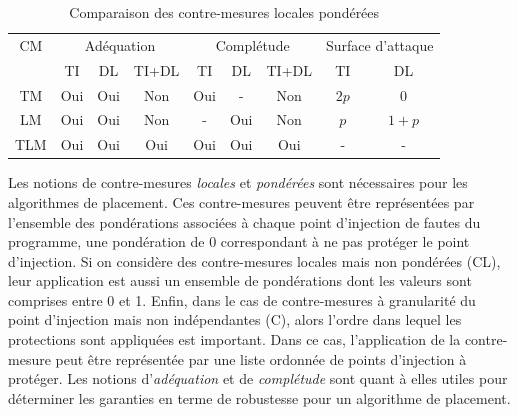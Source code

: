             \begin{table}[h]
                {\small
                \begin{center}
                    \begin{tabular}{c|ccc|ccc|cc}
                    CM & \multicolumn{3}{c|}{Adéquation} & \multicolumn{3}{c|}{Complétude} & \multicolumn{2}{c}{Surface d'attaque}  \\
                    \multicolumn{1}{l|}{} & TI & DL & TI+DL & TI & DL & TI+DL & TI & DL  \\
                    \hline
                    \gls{TM} & Oui & Oui & Non & Oui & - & Non & $2p$ & $0$  \\
                    \gls{LM} & Oui & Oui & Non & - & Oui & Non & $p$ & $1 + p$ \\
                    \gls{TLM} & Oui & Oui & Oui & Oui & Oui & Oui & - & - 
                    \end{tabular}
                \end{center} 
                }
                \caption{Comparaison des contre-mesures locales pondérées\label{tbl:local-cm-comparison}}
            \end{table}
        
            Les notions de contre-mesures \textit{locales} et \textit{pondérées} sont nécessaires pour les algorithmes de placement.
            Ces contre-mesures peuvent être représentées par l'ensemble des pondérations associées à chaque point d'injection de fautes du programme, une pondération de 0 correspondant à ne pas protéger le point d'injection. 
            Si on considère des contre-mesures locales mais non pondérées (\gls{CL}), leur application est aussi un ensemble de pondérations dont les valeurs sont comprises entre 0 et 1.
            Enfin, dans le cas de contre-mesures à granularité du point d'injection mais non indépendantes (C), alors l'ordre dans lequel les protections sont appliquées est important. Dans ce cas, l'application de la contre-mesure peut être représentée par une liste ordonnée de points d'injection à protéger.
            Les notions d'\textit{adéquation} et de \textit{complétude} sont quant à elles utiles pour déterminer les garanties en terme de robustesse pour un algorithme de placement. 
            
